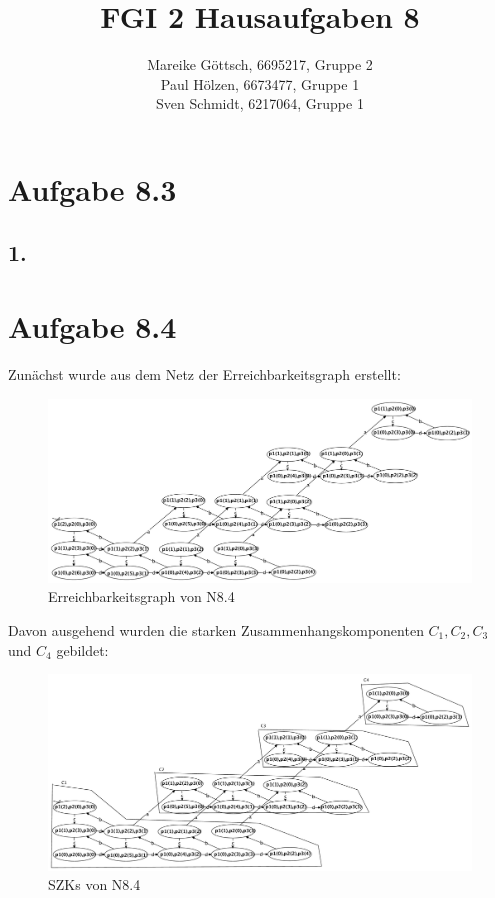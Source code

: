 \documentclass[12pt, paper=a4]{article}
\author{Mareike G\"ottsch, 6695217, Gruppe 2\\Paul H\"olzen, 6673477, Gruppe 1\\Sven Schmidt, 6217064, Gruppe 1}
\title{FGI 2 Hausaufgaben 8}
\begin{document}
\maketitle

\section*{Aufgabe 8.3}
\subsection*{1.}



\section*{Aufgabe 8.4}

Zun\"achst wurde aus dem Netz der Erreichbarkeitsgraph erstellt:

\begin{figure}[h!]
\centering
\includegraphics[scale=0.35]{8_4errg.pdf}
\caption{Erreichbarkeitsgraph von N8.4}
\end{figure}

Davon ausgehend wurden die starken Zusammenhangskomponenten \( C_1, C_2, C_3 \) und \( C_4 \) gebildet:

\begin{figure}[h!]
\centering
\includegraphics[scale=0.35]{8_4SZK.pdf}
\caption{SZKs von N8.4}
\end{figure}
\end{document}

